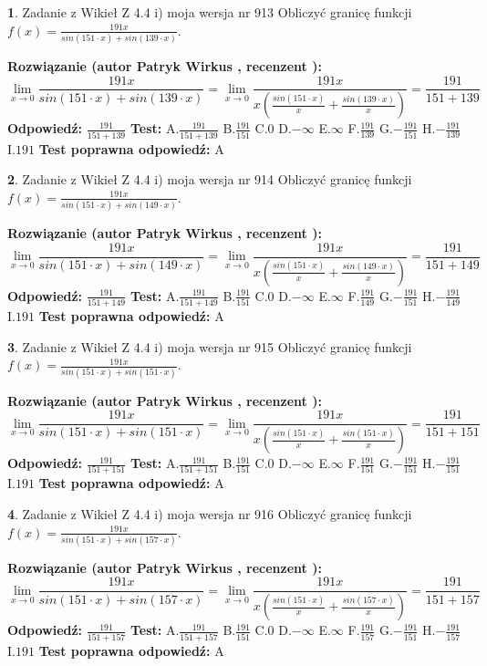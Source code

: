 \documentclass[12pt, a4paper]{article}
\theoremstyle{definition} %
\newtheorem{zad}{}
\newcommand{\zadStart}[1]{\begin{zad}#1\newline}
\newcommand{\zadStop}{\end{zad}}
\newcommand{\rozwStart}[2]{\noindent \textbf{Rozwiązanie (autor #1 , recenzent #2): }\newline}
\newcommand{\rozwStop}{\newline}
\newcommand{\odpStart}{\noindent \textbf{Odpowiedź:}\newline}
\newcommand{\odpStop}{\newline}
\newcommand{\testStart}{\noindent \textbf{Test:}\newline}
\newcommand{\testStop}{\newline}
\newcommand{\kluczStart}{\noindent \textbf{Test poprawna odpowiedź:}\newline}
\newcommand{\kluczStop}{\newline}
\begin{document}
\zadStart{Zadanie z Wikieł Z 4.4 i) moja wersja nr 913}
Obliczyć granicę funkcji $f(x)=\frac{191x}{sin(151\cdot x) +sin(139\cdot x)}$.
\zadStop
\rozwStart{Patryk Wirkus}{}
$$\lim\limits_{x\to 0}\frac{191x}{sin(151\cdot x) +sin(139\cdot x)}=\lim\limits_{x\to 0}\frac{191x}{x(\frac{sin(151\cdot x)}{x}+\frac{sin(139\cdot x)}{x})}=\frac{191}{151+139}$$
\rozwStop
\odpStart
$\frac{191}{151+139}$
\odpStop
\testStart
A.$\frac{191}{151+139}$
B.$\frac{191}{151}$
C.$0$
D.$-\infty$
E.$\infty$
F.$\frac{191}{139}$
G.$-\frac{191}{151}$
H.$-\frac{191}{139}$
I.$191$
\testStop
\kluczStart
A
\kluczStop



\zadStart{Zadanie z Wikieł Z 4.4 i) moja wersja nr 914}
Obliczyć granicę funkcji $f(x)=\frac{191x}{sin(151\cdot x) +sin(149\cdot x)}$.
\zadStop
\rozwStart{Patryk Wirkus}{}
$$\lim\limits_{x\to 0}\frac{191x}{sin(151\cdot x) +sin(149\cdot x)}=\lim\limits_{x\to 0}\frac{191x}{x(\frac{sin(151\cdot x)}{x}+\frac{sin(149\cdot x)}{x})}=\frac{191}{151+149}$$
\rozwStop
\odpStart
$\frac{191}{151+149}$
\odpStop
\testStart
A.$\frac{191}{151+149}$
B.$\frac{191}{151}$
C.$0$
D.$-\infty$
E.$\infty$
F.$\frac{191}{149}$
G.$-\frac{191}{151}$
H.$-\frac{191}{149}$
I.$191$
\testStop
\kluczStart
A
\kluczStop



\zadStart{Zadanie z Wikieł Z 4.4 i) moja wersja nr 915}
Obliczyć granicę funkcji $f(x)=\frac{191x}{sin(151\cdot x) +sin(151\cdot x)}$.
\zadStop
\rozwStart{Patryk Wirkus}{}
$$\lim\limits_{x\to 0}\frac{191x}{sin(151\cdot x) +sin(151\cdot x)}=\lim\limits_{x\to 0}\frac{191x}{x(\frac{sin(151\cdot x)}{x}+\frac{sin(151\cdot x)}{x})}=\frac{191}{151+151}$$
\rozwStop
\odpStart
$\frac{191}{151+151}$
\odpStop
\testStart
A.$\frac{191}{151+151}$
B.$\frac{191}{151}$
C.$0$
D.$-\infty$
E.$\infty$
F.$\frac{191}{151}$
G.$-\frac{191}{151}$
H.$-\frac{191}{151}$
I.$191$
\testStop
\kluczStart
A
\kluczStop



\zadStart{Zadanie z Wikieł Z 4.4 i) moja wersja nr 916}
Obliczyć granicę funkcji $f(x)=\frac{191x}{sin(151\cdot x) +sin(157\cdot x)}$.
\zadStop
\rozwStart{Patryk Wirkus}{}
$$\lim\limits_{x\to 0}\frac{191x}{sin(151\cdot x) +sin(157\cdot x)}=\lim\limits_{x\to 0}\frac{191x}{x(\frac{sin(151\cdot x)}{x}+\frac{sin(157\cdot x)}{x})}=\frac{191}{151+157}$$
\rozwStop
\odpStart
$\frac{191}{151+157}$
\odpStop
\testStart
A.$\frac{191}{151+157}$
B.$\frac{191}{151}$
C.$0$
D.$-\infty$
E.$\infty$
F.$\frac{191}{157}$
G.$-\frac{191}{151}$
H.$-\frac{191}{157}$
I.$191$
\testStop
\kluczStart
A
\kluczStop
\end{document}
